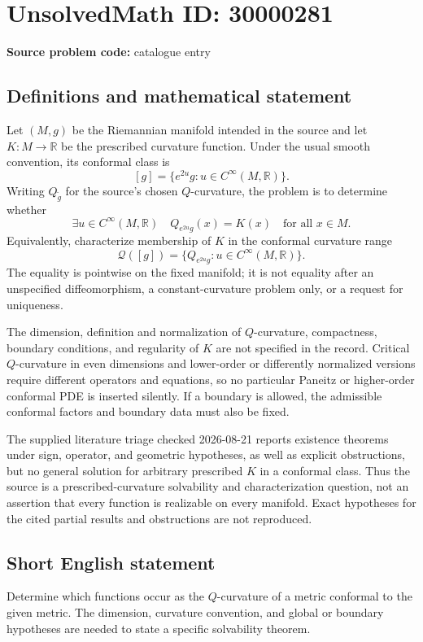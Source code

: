\documentclass[11pt]{article}
\newcommand{\R}{\mathbb{R}}
\begin{document}
\section*{UnsolvedMath ID: 30000281}
\textbf{Source problem code:} catalogue entry
\subsection{Definitions and mathematical statement}
Let \((M,g)\) be the Riemannian manifold intended in the source and let \(K:M\to\R\) be the prescribed curvature function. Under the usual smooth convention, its conformal class is
\[
[g]=\{e^{2u}g:u\in C^\infty(M,\R)\}.
\]
Writing \(Q_{\widetilde g}\) for the source's chosen \(Q\)-curvature, the problem is to determine whether
\[
\exists u\in C^\infty(M,\R)\quad
Q_{e^{2u}g}(x)=K(x)\quad\text{for all }x\in M.
\]
Equivalently, characterize membership of \(K\) in the conformal curvature range
\[
\mathcal Q([g])=\{Q_{e^{2u}g}:u\in C^\infty(M,\R)\}.
\]
The equality is pointwise on the fixed manifold; it is not equality after an unspecified diffeomorphism, a constant-curvature problem only, or a request for uniqueness.

The dimension, definition and normalization of \(Q\)-curvature, compactness, boundary conditions, and regularity of \(K\) are not specified in the record. Critical \(Q\)-curvature in even dimensions and lower-order or differently normalized versions require different operators and equations, so no particular Paneitz or higher-order conformal PDE is inserted silently. If a boundary is allowed, the admissible conformal factors and boundary data must also be fixed.

The supplied literature triage checked 2026-08-21 reports existence theorems under sign, operator, and geometric hypotheses, as well as explicit obstructions, but no general solution for arbitrary prescribed \(K\) in a conformal class. Thus the source is a prescribed-curvature solvability and characterization question, not an assertion that every function is realizable on every manifold. Exact hypotheses for the cited partial results and obstructions are not reproduced.
\subsection{Short English statement}
Determine which functions occur as the \(Q\)-curvature of a metric conformal to the given metric. The dimension, curvature convention, and global or boundary hypotheses are needed to state a specific solvability theorem.
\end{document}
